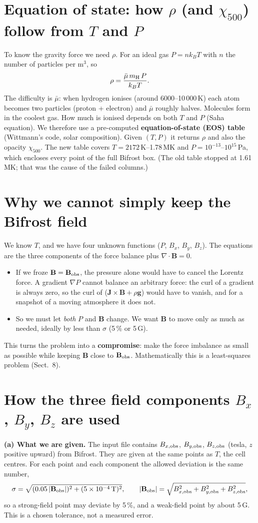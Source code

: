 \documentclass[10pt]{extarticle}
\newcommand{\B}{\mathbf B}\newcommand{\J}{\mathbf J}\newcommand{\Bo}{\mathbf B_{\rm obs}}
\begin{document}
\section{Equation of state: how $\rho$ (and $\chi_{500}$) follow from $T$ and $P$}
To know the gravity force we need $\rho$. For an ideal gas $P=nk_BT$ with $n$ the number of particles per m$^3$, so
\[
\rho=\frac{\bar\mu\,m_{\rm H}\,P}{k_B T}.
\]
The difficulty is $\bar\mu$: when hydrogen ionises (around 6000--10\,000\,K) each atom becomes two particles (proton + electron) and $\bar\mu$ roughly halves. Molecules form in the coolest gas. How much is ionised depends on both $T$ and $P$ (Saha equation). We therefore use a pre-computed \textbf{equation-of-state (EOS) table} (Wittmann's code, solar composition). Given $(T,P)$ it returns $\rho$ and also the opacity $\chi_{500}$. The new table covers $T=2172$\,K--1.78\,MK and $P=10^{-13}$--$10^{15}$\,Pa, which encloses every point of the full Bifrost box. (The old table stopped at 1.61\,MK; that was the cause of the failed columns.)

\section{Why we cannot simply keep the Bifrost field}
We know $T$, and we have four unknown functions ($P$, $B_x$, $B_y$, $B_z$). The equations are the three components of the force balance plus $\nabla\cdot\B=0$.
\begin{itemize}
\item If we froze $\B=\Bo$, the pressure alone would have to cancel the Lorentz force. A gradient $\nabla P$ cannot balance an arbitrary force: the curl of a gradient is always zero, so the curl of ($\J\times\B+\rho\mathbf g$) would have to vanish, and for a snapshot of a moving atmosphere it does not.
\item So we must let \emph{both} $P$ and $\B$ change. We want $\B$ to move only as much as needed, ideally by less than $\sigma$ (5\,\% or 5\,G).
\end{itemize}
This turns the problem into a \textbf{compromise}: make the force imbalance as small as possible while keeping $\B$ close to $\Bo$. Mathematically this is a least-squares problem (Sect.~8).

\section{How the three field components $B_x$, $B_y$, $B_z$ are used}
\textbf{(a) What we are given.} The input file contains $B_{x,{\rm obs}}$, $B_{y,{\rm obs}}$, $B_{z,{\rm obs}}$ (tesla, $z$ positive upward) from Bifrost. They are given at the same points as $T$, the cell centres. For each point and each component the allowed deviation is the same number,
\[
\sigma=\sqrt{(0.05\,|\Bo|)^2+(5\times10^{-4}\,{\rm T})^2},\qquad |\Bo|=\sqrt{B_{x,{\rm obs}}^2+B_{y,{\rm obs}}^2+B_{z,{\rm obs}}^2},
\]
so a strong-field point may deviate by 5\,\%, and a weak-field point by about 5\,G. This is a chosen tolerance, not a measured error.
\end{document}
